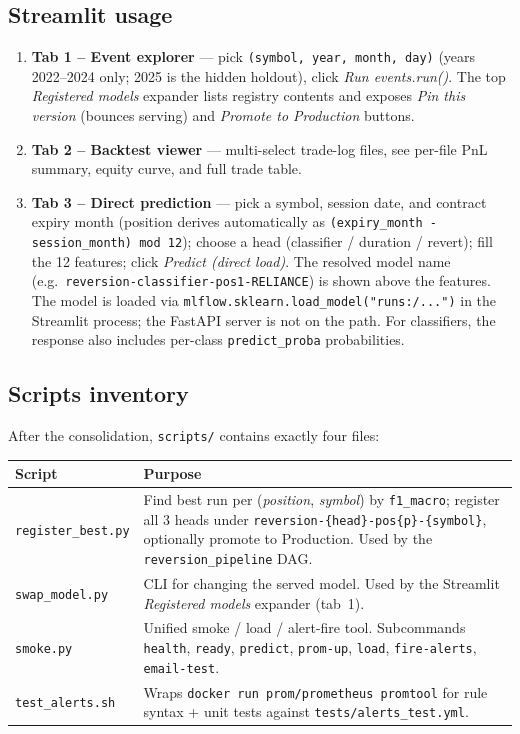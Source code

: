 \documentclass[11pt,a4paper]{article}
\begin{document}
\subsection{Streamlit usage}
\begin{enumerate}[leftmargin=1.5em,itemsep=0pt]
  \item \textbf{Tab 1 -- Event explorer} --- pick \texttt{(symbol, year, month, day)} (years 2022--2024 only; 2025 is the hidden holdout), click \emph{Run events.run()}. The top \emph{Registered models} expander lists registry contents and exposes \emph{Pin this version} (bounces serving) and \emph{Promote to Production} buttons.
  \item \textbf{Tab 2 -- Backtest viewer} --- multi-select trade-log files, see per-file PnL summary, equity curve, and full trade table.
  \item \textbf{Tab 3 -- Direct prediction} --- pick a symbol, session date, and contract expiry month (position derives automatically as \texttt{(expiry\_month - session\_month) mod 12}); choose a head (classifier / duration / revert); fill the 12 features; click \emph{Predict (direct load)}. The resolved model name (e.g.\ \texttt{reversion-classifier-pos1-RELIANCE}) is shown above the features. The model is loaded via \texttt{mlflow.sklearn.load\_model("runs:/...")} in the Streamlit process; the FastAPI server is not on the path. For classifiers, the response also includes per-class \texttt{predict\_proba} probabilities.
\end{enumerate}

\subsection{Scripts inventory}

After the consolidation, \texttt{scripts/} contains exactly four files:

\begin{tabularx}{\linewidth}{@{}lX@{}}
\toprule
\textbf{Script} & \textbf{Purpose} \\
\midrule
\texttt{register\_best.py} & Find best run per (\emph{position}, \emph{symbol}) by \texttt{f1\_macro}; register all 3 heads under \texttt{reversion-\{head\}-pos\{p\}-\{symbol\}}, optionally promote to Production. Used by the \texttt{reversion\_pipeline} DAG. \\
\texttt{swap\_model.py}    & CLI for changing the served model. Used by the Streamlit \emph{Registered models} expander (tab~1). \\
\texttt{smoke.py}          & Unified smoke / load / alert-fire tool. Subcommands \texttt{health}, \texttt{ready}, \texttt{predict}, \texttt{prom-up}, \texttt{load}, \texttt{fire-alerts}, \texttt{email-test}. \\
\texttt{test\_alerts.sh}   & Wraps \texttt{docker run prom/prometheus promtool} for rule syntax + unit tests against \texttt{tests/alerts\_test.yml}. \\
\bottomrule
\end{tabularx}
\end{document}
